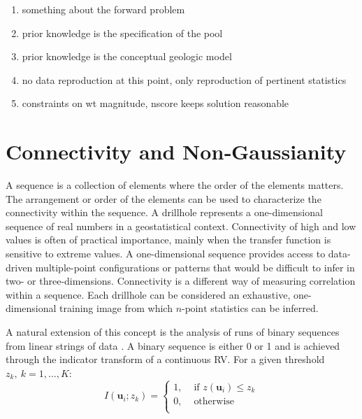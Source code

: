 \begin{enumerate}
    \item something about the forward problem
    \item prior knowledge is the specification of the pool
    \item prior knowledge is the conceptual geologic model
    \item no data reproduction at this point, only reproduction of pertinent statistics
    \item constraints on wt magnitude, nscore keeps solution reasonable
\end{enumerate}


\FloatBarrier
\section{Connectivity and Non‐Gaussianity}
\label{sec:03connect}

A sequence is a collection of elements where the order of the elements matters. The arrangement or order of the elements can be used to characterize the connectivity within the sequence. A drillhole represents a one-dimensional sequence of real numbers in a geostatistical context. Connectivity of high and low values is often of practical importance, mainly when the transfer function is sensitive to extreme values. A one-dimensional sequence provides access to data-driven multiple-point configurations or patterns that would be difficult to infer in two- or three-dimensions. Connectivity is a different way of measuring correlation within a sequence. Each drillhole can be considered an exhaustive, one-dimensional training image from which $n\text{-point}$ statistics can be inferred.

A natural extension of this concept is the analysis of runs of binary sequences from linear strings of data \citep{ortiz2003characterization}. A binary sequence is either 0 or 1 and is achieved through the indicator transform of a continuous \gls{RV}. For a given threshold $z_{k}, \ k=1,\dots,K$:
\begin{equation}
    I(\mathbf{u}_{i};z_{k}) =
    \begin{cases}
        1, & \text{ if }z(\mathbf{u}_{i}) \leq z_{k} \\
        0, & \text{ otherwise }                      \\
    \end{cases}
    \label{eq:indicator}
\end{equation}

